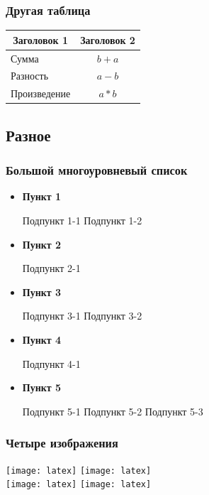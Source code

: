 \begin{frame}
    \frametitle{Другая таблица}
    \centering
    \begin{tabular}{lc}
        \toprule
        \multicolumn{1}{c}{\textbf{Заголовок 1}} & \textbf{Заголовок 2} \\ \midrule
        Сумма                                    & \(b+a\)              \\
        Разность                                 & \(a-b\)              \\
        Произведение                             & \(a*b\)              \\
        \bottomrule
    \end{tabular}
\end{frame}


\subsection{Разное}

\begin{frame}
    \frametitle{Большой многоуровневый список}
    \begin{itemize}
        \item \textbf{Пункт 1}
              \begin{itemize}
                  \itemi Подпункт 1-1
                  \itemi Подпункт 1-2
              \end{itemize}
        \item \textbf{Пункт 2}
              \begin{itemize}
                  \itemi Подпункт 2-1
              \end{itemize}
        \item \textbf{Пункт 3}
              \begin{itemize}
                  \itemi Подпункт 3-1
                  \itemi Подпункт 3-2
              \end{itemize}
        \item \textbf{Пункт 4}
              \begin{itemize}
                  \itemi Подпункт 4-1
              \end{itemize}
        \item \textbf{Пункт 5}
              \begin{itemize}
                  \itemi Подпункт 5-1
                  \itemi Подпункт 5-2
                  \itemi Подпункт 5-3
              \end{itemize}
    \end{itemize}
\end{frame}

\begin{frame}
    \frametitle{Четыре изображения}
    \centering
    \texttt{[image: latex]}
    \texttt{[image: latex]}\\
    \texttt{[image: latex]}
    \texttt{[image: latex]}
\end{frame}

